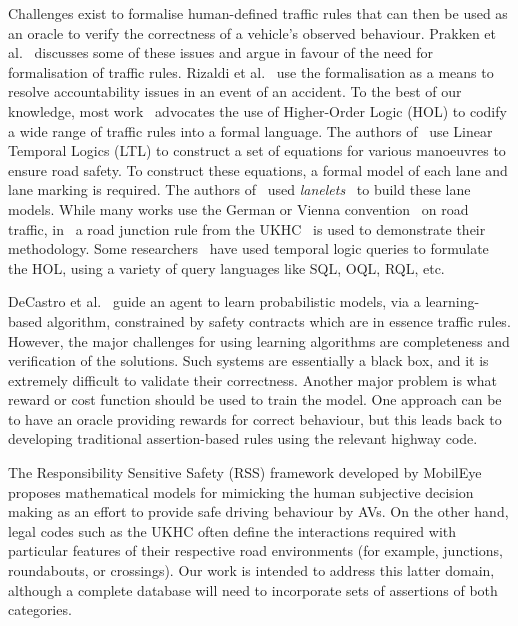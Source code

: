 
Challenges exist to formalise human-defined traffic rules that can then be used as an oracle to verify the correctness of a vehicle's observed behaviour. 
%
Prakken et al.~\cite{lawabidingstudy} discusses some of these issues and argue in favour of the need for formalisation of traffic rules. Rizaldi et al.~\cite{acountability} use the formalisation as a means to resolve accountability issues in an event of an accident. To the best of our knowledge, most work~\cite{acountability, esterle, rizaldi, alves} advocates the use of Higher-Order Logic (HOL) to codify a wide range of traffic rules into a formal language. The authors of~\cite{acountability, esterle, rizaldi, alves} use Linear Temporal Logics (LTL) to construct a set of equations for various manoeuvres to ensure road safety. To construct these equations, a formal model of each lane and lane marking is required. The authors of~\cite{rizaldi} used \textit{lanelets}~\cite{lanelets2014} to build these lane models. While many works use the German or Vienna convention~\cite{vienna} on road traffic, in~\cite{alves} a road junction rule from the UKHC~\cite{highwayCode} is used to demonstrate their methodology. Some researchers~\cite{sqlhuang, sqlgueffaz} have used temporal logic queries to formulate the HOL, using a variety of query languages like SQL, OQL, RQL, etc.  

DeCastro et al.~\cite{decastro} guide an agent to learn probabilistic models, via a learning-based algorithm, constrained by safety contracts which are in essence traffic rules. However, the major challenges for using learning algorithms are completeness and verification of the solutions. Such systems are essentially a black box, and it is extremely difficult to validate their correctness. Another major problem is what reward or cost function should be used to train the model. One approach can be to have an oracle providing rewards for correct behaviour, but this leads back to developing traditional assertion-based rules using the relevant highway code.

The Responsibility Sensitive Safety (RSS) framework developed by MobilEye~\cite{RSS_Shalev_Shwartz2017, RSS2_Koopman2019} proposes mathematical models for mimicking the human subjective decision making as an effort to provide safe driving behaviour by AVs. On the other hand, legal codes such as the UKHC often define the interactions required with particular features of their respective road environments (for example, junctions, roundabouts, or crossings). Our work is intended to address this latter domain, although a complete database will need to incorporate sets of assertions of both categories. 


